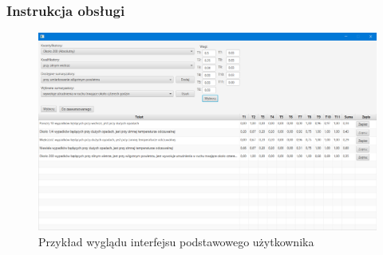 \documentclass{classrep}
\begin{document}
\newpage


\subsubsection{Instrukcja obsługi}

\begin{figure}[h!]
 \centering
 \includegraphics[width=15cm]{gui.png}
 \vspace{-0.3cm}
 \caption{Przykład wyglądu interfejsu podstawowego użytkownika}
 \label{gui}
\end{figure}
\end{document}
